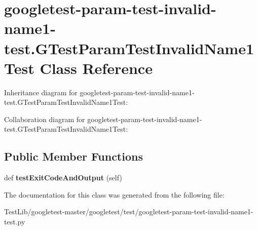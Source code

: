 \hypertarget{classgoogletest-param-test-invalid-name1-test_1_1GTestParamTestInvalidName1Test}{}\section{googletest-\/param-\/test-\/invalid-\/name1-\/test.G\+Test\+Param\+Test\+Invalid\+Name1\+Test Class Reference}
\label{classgoogletest-param-test-invalid-name1-test_1_1GTestParamTestInvalidName1Test}


Inheritance diagram for googletest-\/param-\/test-\/invalid-\/name1-\/test.G\+Test\+Param\+Test\+Invalid\+Name1\+Test\+:


Collaboration diagram for googletest-\/param-\/test-\/invalid-\/name1-\/test.G\+Test\+Param\+Test\+Invalid\+Name1\+Test\+:
\subsection*{Public Member Functions}
\begin{DoxyCompactItemize}
\item 
\mbox{\label{classgoogletest-param-test-invalid-name1-test_1_1GTestParamTestInvalidName1Test_a2b7024a50e0b3b0fe9b0c6d28e470681}} 
def {\bfseries test\+Exit\+Code\+And\+Output} (self)
\end{DoxyCompactItemize}


The documentation for this class was generated from the following file\+:\begin{DoxyCompactItemize}
\item 
Test\+Lib/googletest-\/master/googletest/test/googletest-\/param-\/test-\/invalid-\/name1-\/test.\+py\end{DoxyCompactItemize}
